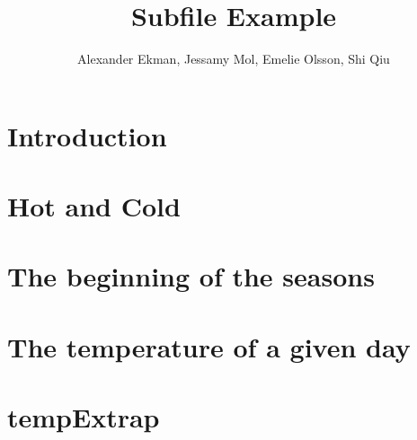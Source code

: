 \documentclass[a4paper]{article}
\title{Subfile Example}
\author{Alexander Ekman, Jessamy Mol, Emelie Olsson, Shi Qiu}
\date{ }
\begin{document}
 
 
 

\maketitle

\section{Introduction}
 


\section{Hot and Cold}


\section{The beginning of the seasons}


\section{The temperature of a given day}


\section{tempExtrap}


\newpage


 
\end{document}
